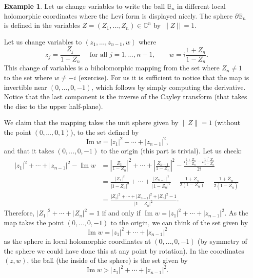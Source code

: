 \documentclass[12pt,openany]{book}
\renewcommand{\Im}{\operatorname{Im}}
\newcommand{\sabs}[1]{\lvert {#1} \rvert}
\newcommand{\snorm}[1]{\lVert {#1} \rVert}
\newcommand{\abs}[1]{\left\lvert {#1} \right\rvert}
\newcommand{\C}{{\mathbb{C}}}
\newcommand{\bB}{{\mathbb{B}}}
\theoremstyle{plain}
\theoremstyle{remark}
\theoremstyle{definition}
\theoremstyle{exercise}
\theoremstyle{example}
\newtheorem{example}[thm]{Example}
\begin{document}
\begin{example}
Let us change variables to write the ball $\bB_n$ in different
local holomorphic coordinates where the Levi form is displayed nicely.
The sphere $\partial \bB_n$ is defined in the variables $Z = (Z_1,\ldots,Z_n) \in \C^n$
by $\snorm{Z} = 1$.

Let us change variables 
to $(z_1,\ldots,z_{n-1},w)$ where
\begin{equation*}
z_j = \frac{Z_j}{1-Z_n} \quad \text{ for all $j=1,\ldots,n-1$}, \qquad
w = i\frac{1+Z_n}{1-Z_n} .
\end{equation*}
This change of variables is a biholomorphic mapping from the set where $Z_n \not= 1$
to the set where $w\not= -i$ (exercise).  For us it is 
sufficient to notice that the map is invertible near
$(0,\ldots,0,-1)$, which follows by simply computing the derivative.
Notice
that the last component is the inverse of the Cayley transform (that takes
the disc to the upper half-plane).

We claim that the mapping takes the unit sphere given by $\snorm{Z} = 1$
(without the point $(0,\ldots,0,1)$), to
the set defined by
\begin{equation*}
\Im w = \sabs{z_1}^2 + \cdots + \sabs{z_{n-1}}^2 ,
\end{equation*}
and that it takes $(0,\ldots,0,-1)$ to the origin (this part is trivial).
Let us check:
\begin{equation*}
\begin{split}
\sabs{z_1}^2 + \cdots + \sabs{z_{n-1}}^2 - \Im w
& =
\abs{\frac{Z_1}{1-Z_n}}^2
+ \cdots +
\abs{\frac{Z_{n-1}}{1-Z_n}}^2
-
\frac{
i\frac{1+Z_n}{1-Z_n} -
\overline{
i\frac{1+Z_n}{1-Z_n}}
}{2i}
\\
& =
\frac{\sabs{Z_1}^2}{\sabs{1-Z_n}^2}
+ \cdots +
\frac{\sabs{Z_{n-1}}^2}{\sabs{1-Z_n}^2}
-
\frac{1+Z_n}{2(1-Z_n)} -
\frac{1+\bar{Z}_n}{2(1-\bar{Z}_n)}
\\
& = 
\frac{\sabs{Z_1}^2
+ \cdots +
\sabs{Z_{n-1}}^2
+
\sabs{Z_n}^2-1}{\sabs{1-Z_n}^2} .
\end{split}
\end{equation*}
Therefore, $\sabs{Z_1}^2 + \cdots + \sabs{Z_n}^2 = 1$ if and only if $\Im w =
\sabs{z_1}^2 + \cdots + \sabs{z_{n-1}}^2$.
As the map takes the point $(0,\ldots,0,-1)$ to the origin, we can
think of the set given by
\begin{equation*}
\Im w = \sabs{z_1}^2 + \cdots + \sabs{z_{n-1}}^2 
\end{equation*}
as the sphere in local holomorphic coordinates at $(0,\ldots,0,-1)$ (by symmetry
of the sphere we could have done this at any point by rotation).
In the coordinates $(z,w)$, the ball (the inside of the sphere) is the set given by
\begin{equation*}
\Im w > \sabs{z_1}^2 + \cdots + \sabs{z_{n-1}}^2 .
\end{equation*}


\end{example}
\end{document}
